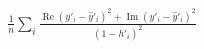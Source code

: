 \documentclass[10pt]{article}
\begin{document}
\begin{align*}\frac{1}{n}\sum_i \frac{\operatorname{Re}\left(y'_i - \hat{y}'_i\right)^2 + \operatorname{Im}\left(y'_i - \hat{y}'_i\right)^2}{\left(1 - h'_i\right)^2}\end{align*}
\end{document}
